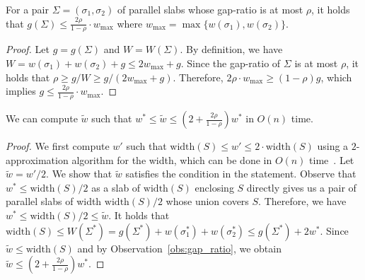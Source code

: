 \documentclass[english,a4paper, cleveref, autoref, thm-restate, nolineno]{socg-lipics-v2021}
\theoremstyle{star}
\theoremstyle{claimstar}
\newcommand{\width}{\ensuremath{\mathrm{width}}}
\begin{document}
\begin{observation}
    \label{obs:gap_ratio}
    For a pair $\Sigma = (\sigma_1, \sigma_2)$ of parallel slabs  whose gap-ratio is at most $\rho$,
    it holds that $g(\Sigma) \le \frac{2\rho}{1-\rho} \cdot w_{\max}$ where $w_{\max} = \max \{w(\sigma_1), w(\sigma_2)\}$. 

\begin{proof}
    Let $g = g(\Sigma)$ and $W = W(\Sigma)$.
    By definition, we have $W = w(\sigma_1) + w(\sigma_2) + g \le 2w_{\max} + g$.
    Since the gap-ratio of $\Sigma$ is at most $\rho$, it holds that $\rho \ge g/W \ge g/(2w_{\max} + g)$.
    Therefore, $2\rho\cdot w_{\max} \ge (1-\rho)g$, which implies $g \le \frac{2\rho}{1-\rho}\cdot w_{\max}$.   
\end{proof}
    
\end{observation}

\begin{lemma}
\label{lem:small_gap_const}
We can compute $\widetilde w$ such that $w^* \le \widetilde w \le (2 + \frac{2\rho}{1-\rho} ) w^* $ in $O(n)$ time.
\end{lemma}

\begin{proof}
We first compute $w'$ such that $\width(S) \le w' \le 2\cdot \width(S)$ using a $2$-approximation algorithm for the width, 
which can be done in $O(n)$ time~\cite{chan2006faster}. 
Let $\widetilde w = w'/2$. 
We show that $\widetilde w$ satisfies the condition in the statement. Observe that $w^* \le \width(S)/2$ as a slab of $\width(S)$ enclosing $S$ directly gives us a pair of parallel slabs of width $\width(S)/2$ whose union covers $S$. 
Therefore, we have $w^* \le \width(S)/2 \le \widetilde w$. It holds that $\width(S) \le W(\Sigma^*) = g(\Sigma^*) + w(\sigma_1^*) + w(\sigma_2^*) \le g(\Sigma^*) + 2w^*$. Since $\widetilde w \le \width(S)$ and by Observation~\ref{obs:gap_ratio}, we obtain $\widetilde w \le (2 + \frac{2\rho}{1-\rho}) w^*$.
\end{proof}



\end{document}
